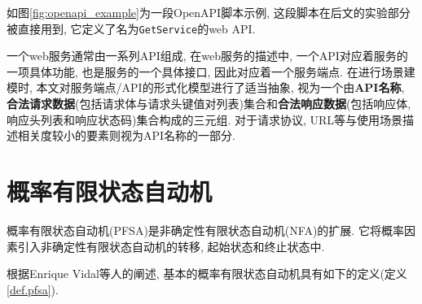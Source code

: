         如图\ref{fig:openapi_example}为一段OpenAPI脚本示例, 这段脚本在后文的实验部分被直接用到, 它定义了名为\texttt{GetService}的web API.
        
        一个web服务通常由一系列API组成, 在web服务的描述中, 一个API对应着服务的一项具体功能, 也是服务的一个具体接口, 因此对应着一个服务端点. 在进行场景建模时, 本文对服务端点/API的形式化模型进行了适当抽象, 视为一个由\textbf{API名称}, \textbf{合法请求数据}(包括请求体与请求头键值对列表)集合和\textbf{合法响应数据}(包括响应体, 响应头列表和响应状态码)集合构成的三元组. 对于请求协议, URL等与使用场景描述相关度较小的要素则视为API名称的一部分.
    
    \section{概率有限状态自动机}
        
        概率有限状态自动机(PFSA)是非确定性有限状态自动机(NFA)的扩展. 它将概率因素引入非确定性有限状态自动机的转移, 起始状态和终止状态中.
        
        根据Enrique Vidal等人的阐述\cite{enriquev05}, 基本的概率有限状态自动机具有如下的定义(定义\ref{def.pfsa}).
        
